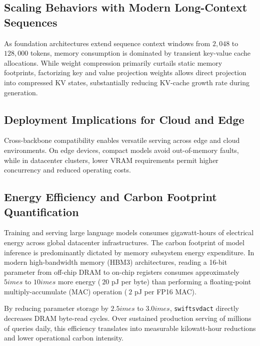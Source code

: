\subsection{Scaling Behaviors with Modern Long-Context Sequences}
As foundation architectures extend sequence context windows from $2{,}048$ to $128{,}000$ tokens, memory consumption is dominated by transient key-value cache allocations. While weight compression primarily curtails static memory footprints, factorizing key and value projection weights allows direct projection into compressed KV states, substantially reducing KV-cache growth rate during generation.

\subsection{Deployment Implications for Cloud and Edge}
Cross-backbone compatibility enables versatile serving across edge and cloud environments. On edge devices, compact models avoid out-of-memory faults, while in datacenter clusters, lower VRAM requirements permit higher concurrency and reduced operating costs.

\subsection{Energy Efficiency and Carbon Footprint Quantification}
Training and serving large language models consumes gigawatt-hours of electrical energy across global datacenter infrastructures. The carbon footprint of model inference is predominantly dictated by memory subsystem energy expenditure. In modern high-bandwidth memory (HBM3) architectures, reading a 16-bit parameter from off-chip DRAM to on-chip registers consumes approximately $5	imes$ to $10	imes$ more energy ($~20$ pJ per byte) than performing a floating-point multiply-accumulate (MAC) operation ($~2$ pJ per FP16 MAC).

By reducing parameter storage by $2.5	imes$ to $3.0	imes$, \texttt{swiftsvdact} directly decreases DRAM byte-read cycles. Over sustained production serving of millions of queries daily, this efficiency translates into measurable kilowatt-hour reductions and lower operational carbon intensity.

